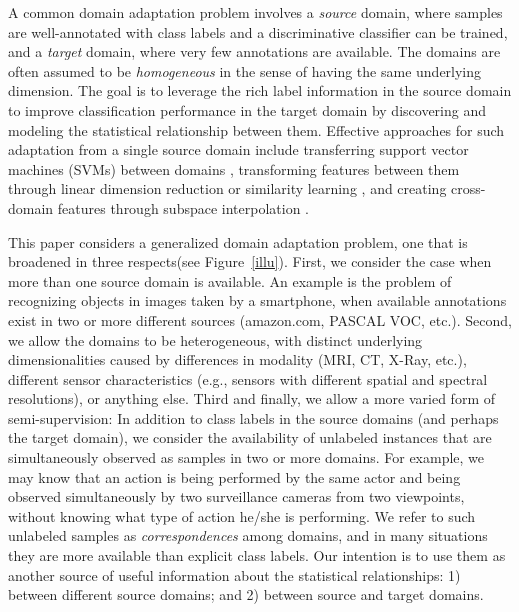 \documentclass[10pt,twocolumn,letterpaper]{article}
\begin{document}
A common domain adaptation problem involves a \textit{source} domain, where samples are well-annotated with class labels and a discriminative classifier can be trained, and a \textit{target} domain, where very few annotations are available. The domains are often assumed to be \emph{homogeneous} in the sense of having the same underlying dimension. The goal is to leverage the rich label information in the source domain to improve classification performance in the target domain by discovering and modeling the statistical relationship between them. Effective approaches for such adaptation from a single source domain include transferring support vector machines (SVMs) between domains \cite{Daume:simpleSVM,Bruzzone:DASVM,Duan:MKL,Schweikert:SVMsurvey,Bergamo:SVMsurvey}, transforming features between them through linear dimension reduction \cite{Ling:Spectral,Pan:TCA} or similarity learning \cite{Kulis:ML,Saenko:ML}, and creating cross-domain features through subspace interpolation \cite{Gopalan:Grassmann, Gong:Grassmann}. 

This paper considers a generalized domain adaptation problem, one that is broadened in three respects(see Figure~\ref{illu}). First, we consider the case when more than one source domain is available. An example is the problem of recognizing objects in images taken by a smartphone, when available annotations exist in two or more different sources (amazon.com, PASCAL VOC\cite{Everingham10}, etc.). Second, we allow the domains to be heterogeneous, with distinct underlying dimensionalities caused by differences in modality (MRI, CT, X-Ray, etc.), different sensor characteristics (e.g., sensors with different spatial and spectral resolutions), or anything else. Third and finally, we allow a more varied form of semi-supervision: In addition to class labels in the source domains (and perhaps the target domain), we consider the availability of unlabeled instances that are simultaneously observed as samples in two or more domains. For example, we may know that an action is being performed by the same actor and being observed simultaneously by two surveillance cameras from two viewpoints, without knowing what type of action he/she is performing. We refer to such unlabeled samples as \emph{correspondences} among domains, and in many situations they are more available than explicit class labels. Our intention is to use them as another source of useful information about the statistical relationships: 1) between different source domains; and 2) between source and target domains. 
\end{document}
